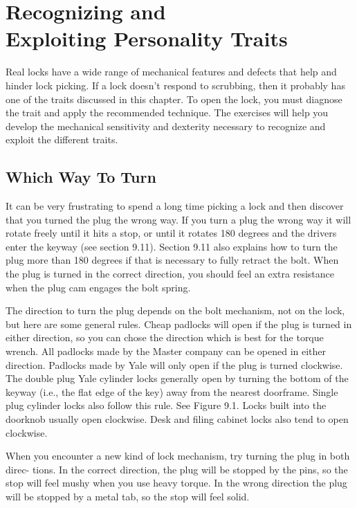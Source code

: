 \chapter{Recognizing and \\ Exploiting Personality Traits}
Real locks have a wide range of mechanical features and defects that help and hinder lock 
picking. If a lock doesn't respond to scrubbing, then it probably has one of the traits 
discussed in this chapter. To open the lock, you must diagnose the trait and apply the 
recommended technique. The exercises will help you develop the mechanical sensitivity and 
dexterity necessary to recognize and exploit the different traits.

\section{Which Way To Turn}
It can be very frustrating to spend a long time picking a lock and then discover that you 
turned the plug the wrong way. If you turn a plug the wrong way it will rotate freely until it 
hits a stop, or until it rotates 180 degrees and the drivers enter the keyway (see section 9.11). 
Section 9.11 also explains how to turn the plug more than 180 degrees if that is necessary 
to fully retract the bolt. When the plug is turned in the correct direction, you should feel 
an extra resistance when the plug cam engages the bolt spring. 

The direction to turn the plug depends on the bolt mechanism, not on the lock, but here 
are some general rules. Cheap padlocks will open if the plug is turned in either direction, so 
you can chose the direction which is best for the torque wrench. All padlocks made by the 
Master company can be opened in either direction. Padlocks made by Yale will only open if 
the plug is turned clockwise. The double plug Yale cylinder locks generally open by turning 
the bottom of the keyway (i.e., the flat edge of the key) away from the nearest doorframe. 
Single plug cylinder locks also follow this rule. See Figure 9.1. Locks built into the doorknob 
usually open clockwise. Desk and filing cabinet locks also tend to open clockwise. 

When you encounter a new kind of lock mechanism, try turning the plug in both direc- 
tions. In the correct direction, the plug will be stopped by the pins, so the stop will feel 
mushy when you use heavy torque. In the wrong direction the plug will be stopped by a 
metal tab, so the stop will feel solid. 

